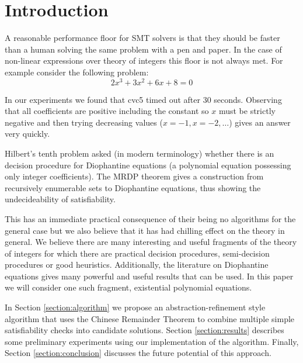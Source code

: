 \section{Introduction}

A reasonable performance floor for SMT solvers is that they should be
faster than a human solving the same problem with a pen and paper.
%
In the case of non-linear expressions over theory of integers this
floor is not always met.
%
For example consider the following problem: 
\[2x^3 + 3x^2 + 6x + 8 = 0\]

In our experiments we found that cvc5 timed out after 30 
seconds.
Observing that all coefficients are positive including the
constant so $x$ must be strictly negative and then trying decreasing
values ($x = -1, x = -2, \dots$) gives an answer very quickly.

Hilbert's tenth problem asked (in modern terminology) whether 
there is an decision procedure for Diophantine equations 
(a polynomial equation possessing only integer coefficients).
%
The MRDP theorem gives a construction from recursively enumerable sets
to Diophantine equations, thus showing the undecideability of satisfiability.

This has an immediate practical consequence of their being no
algorithms for the general case but we also believe that it has had
chilling effect on the theory in general.
%
We believe there are many interesting and useful fragments of the
theory of integers for which there are practical decision procedures,
semi-decision procedures or good heuristics.
%
Additionally, the literature on Diophantine equations gives many
powerful and useful results that can be used.
%
In this paper we will consider one such fragment, existential
polynomial equations.

In Section \ref{section:algorithm} we propose an
abstraction-refinement style algorithm that uses the Chinese Remainder
Theorem to combine multiple simple satisfiability checks into
candidate solutions.
Section \ref{section:results} describes some preliminary experiments
using our implementation of the algorithm.
Finally, Section \ref{section:conclusion} discusses the future
potential of this approach.
